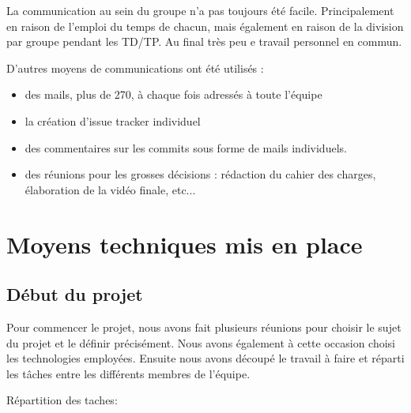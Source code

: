 \documentclass{report}
\begin{document}
La communication au sein du groupe n’a pas toujours été facile.
Principalement en raison de l’emploi du temps de chacun, mais également
en raison de la division par groupe pendant les TD/TP. Au final très peu
e travail personnel en commun.

D’autres moyens de communications ont été utilisés :
\begin{itemize}
\item des mails, plus de 270, à chaque fois adressés à toute l’équipe
\item la création d’issue tracker individuel
\item des commentaires sur les commits sous forme de mails individuels.
\item des réunions pour les grosses décisions : rédaction du cahier des
charges, élaboration de la vidéo finale, etc...
\end{itemize}

\newpage

\section{Moyens techniques mis en place}
\bigskip


\subsection{Début du projet}
\bigskip


Pour commencer le projet, nous avons fait plusieurs réunions pour
choisir le sujet du projet et le définir précisément. Nous avons
également à cette occasion choisi les technologies employées.
Ensuite nous avons découpé le travail à faire et réparti les tâches
entre les différents membres de l’équipe.

Répartition des taches:
\end{document}

